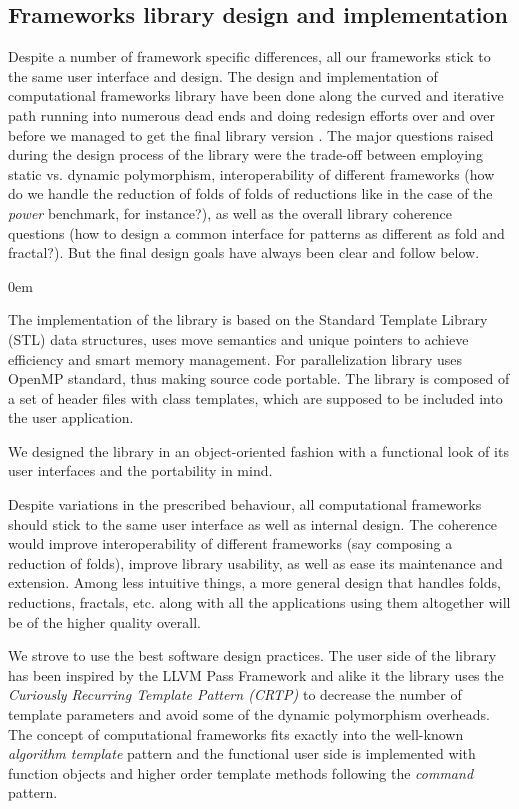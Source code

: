 \subsection{Frameworks library design and implementation}
\label{frameworks_library_design}
\quad Despite a number of framework specific differences, all our frameworks stick to the same user interface and design. The design and implementation of computational frameworks library have been done along the curved and iterative path running into numerous dead ends and doing redesign efforts over and over before we managed to get the final library version \cite{frameworks-repo}. The major questions raised during the design process of the library were the trade-off between employing static vs. dynamic polymorphism, interoperability of different frameworks (how do we handle the reduction of folds of folds of reductions like in the case of the \textit{power} benchmark, for instance?), as well as the overall library coherence questions (how to design a common interface for patterns as different as fold and fractal?). But the final design goals have always been clear and follow below.
\begin{description}[style=unboxed,leftmargin=0cm]
\itemsep0em
\item[Modern C++] The implementation of the library is based on the Standard Template Library (STL) data structures, uses move semantics and unique pointers to achieve efficiency and smart memory management. For parallelization library uses OpenMP standard, thus making source code portable. The library is composed of a set of header files with class templates, which are supposed to be included into the user application.
\item[Convenience] We designed the library in an object-oriented fashion with a functional look of its user interfaces and the portability in mind.
\item[Coherence] Despite variations in the prescribed behaviour, all computational frameworks should stick to the same user interface as well as internal design. The coherence would improve interoperability of different frameworks (say composing a reduction of folds), improve library usability, as well as ease its maintenance and extension. Among less intuitive things, a more general design that handles folds, reductions, fractals, etc. along with all the applications using them altogether will be of the higher quality overall.
\item[Sound design] We strove to use the best software design practices. The user side of the library has been inspired by the LLVM Pass Framework \cite{llvm-compiler-infrastructure} and alike it the library uses the \textit{Curiously Recurring Template Pattern (CRTP)} to decrease the number of template parameters and avoid some of the dynamic polymorphism overheads. The concept of computational frameworks fits exactly into the well-known \textit{algorithm template} pattern and the functional user side is implemented with function objects and higher order template methods following the \textit{command} pattern.
\end{description}
